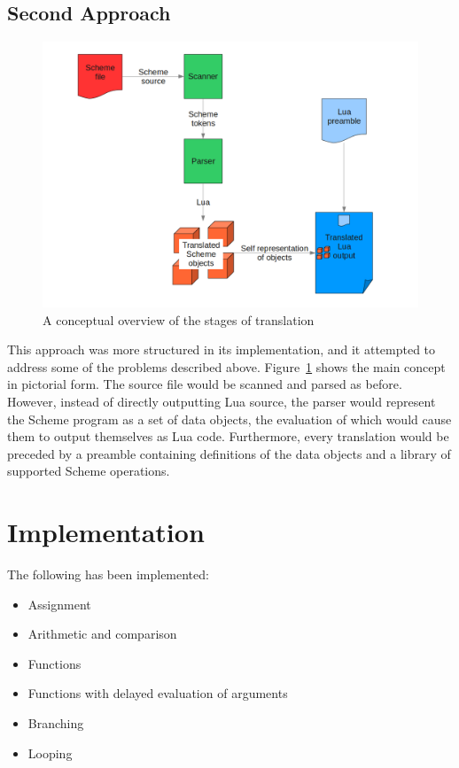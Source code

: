 \subsection{Second Approach}

\begin{figure}
\centering
\includegraphics[width=\textwidth]{overview.png}
\caption{A conceptual overview of the stages of translation}
\label{fig:overview}
\end{figure}

This approach was more structured in its implementation, and it attempted to
address some of the problems described above. Figure~\ref{fig:overview} shows
the main concept in pictorial form. The source file would be scanned and parsed
as before. However, instead of directly outputting Lua source, the parser would
represent the Scheme program as a set of data objects, the evaluation of which
would cause them to output themselves as Lua code. Furthermore, every
translation would be preceded by a preamble containing definitions of the data
objects and a library of supported Scheme operations.


\section{Implementation}

The following has been implemented:
\begin{itemize}
\item Assignment
\item Arithmetic and comparison
\item Functions
\item Functions with delayed evaluation of arguments
\item Branching
\item Looping
\end{itemize}

